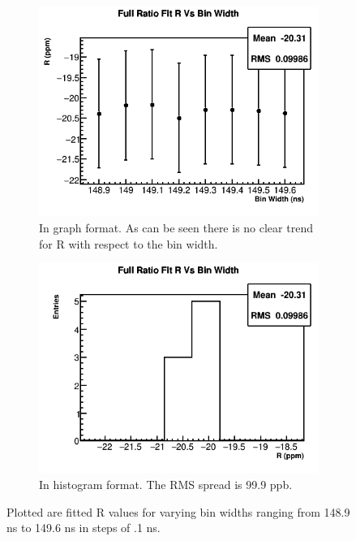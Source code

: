 		\begin{figure}[]
		    \begin{subfigure}[t]{0.45\textwidth}
			    \centering
				\includegraphics[width=\textwidth]{BinWidthComparison_R}
			    \caption{In graph format. As can be seen there is no clear trend for R with respect to the bin width.}
		    \end{subfigure}
		    \hspace{4mm}
		    \begin{subfigure}[t]{0.45\textwidth}
			    \centering
				\includegraphics[width=\textwidth]{BinWidthComparison_R_hist}
			    \caption{In histogram format. The RMS spread is 99.9 ppb.}
		    \end{subfigure}%
		\caption[BinWidth]{Plotted are fitted R values for varying bin widths ranging from 148.9 ns to 149.6 ns in steps of .1 ns.}
		\label{fig:BinWidth}
		\end{figure}

